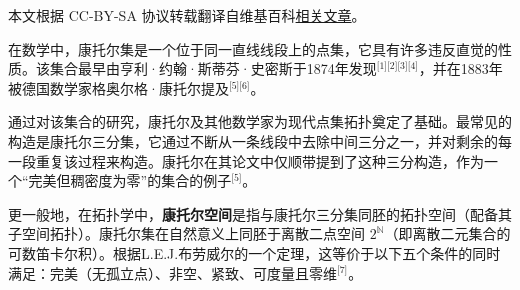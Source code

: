
本文根据 CC-BY-SA 协议转载翻译自维基百科\href{https://en.wikipedia.org/wiki/Cantor_set}{相关文章}。

在数学中，康托尔集是一个位于同一直线线段上的点集，它具有许多违反直觉的性质。该集合最早由亨利·约翰·斯蒂芬·史密斯于1874年发现\(^\text{[1][2][3][4]}\)，并在1883年被德国数学家格奥尔格·康托尔提及\(^\text{[5][6]}\)。

通过对该集合的研究，康托尔及其他数学家为现代点集拓扑奠定了基础。最常见的构造是康托尔三分集，它通过不断从一条线段中去除中间三分之一，并对剩余的每一段重复该过程来构造。康托尔在其论文中仅顺带提到了这种三分构造，作为一个“完美但稠密度为零”的集合的例子\(^\text{[5]}\)。

更一般地，在拓扑学中，\textbf{康托尔空间}是指与康托尔三分集同胚的拓扑空间（配备其子空间拓扑）。康托尔集在自然意义上同胚于离散二点空间
\(2^\mathbb{N}\)（即离散二元集合的可数笛卡尔积）。根据L.E.J.布劳威尔的一个定理，这等价于以下五个条件的同时满足：完美（无孤立点）、非空、紧致、可度量且零维\(^\text{[7]}\)。
